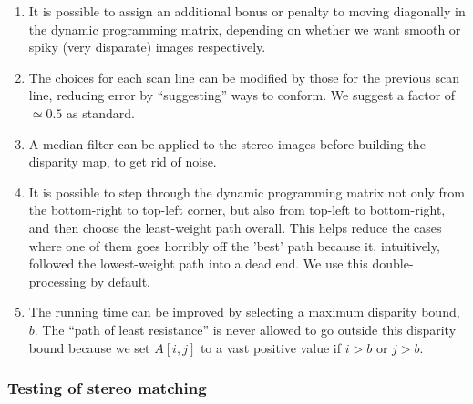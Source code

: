 \begin{enumerate}
\item It is possible to assign an additional bonus or penalty to moving
  diagonally in the dynamic programming matrix, depending on whether we want
  smooth or spiky (very disparate) images respectively.

\item The choices for each scan line can be modified by those for the previous
  scan line, reducing error by ``suggesting'' ways to conform. We suggest a factor
 of $\simeq 0.5$ as standard.

\item A median filter can be applied to the stereo images before building the
  disparity map, to get rid of noise.

\item It is possible to step through the dynamic programming matrix not only from
  the bottom-right to top-left corner, but also from top-left to bottom-right,
  and then choose the least-weight path overall. This helps reduce the cases
  where one of them goes horribly off the 'best' path because it, intuitively,
  followed the lowest-weight path into a dead end. We use this double-processing
 by default.

\item The running time can be improved by selecting a maximum disparity bound,
  $b$. The ``path of least resistance'' is never allowed to go outside this
  disparity bound because we set $A[i,j]$ to a vast positive value if $i > b$ or
  $j > b$.
\end{enumerate}




\subsubsection{Testing of stereo matching}


